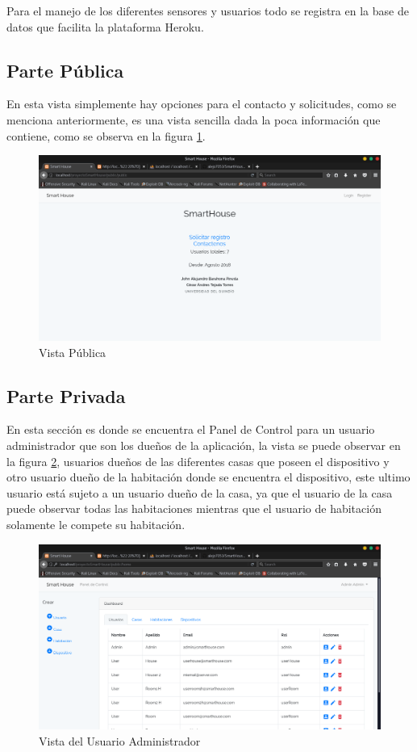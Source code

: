 Para el manejo de los diferentes sensores y usuarios todo se registra en la base de datos que facilita la plataforma Heroku.\\

\subsection{Parte Pública}

En esta vista simplemente hay opciones para el contacto y solicitudes, como se menciona anteriormente, es una vista sencilla dada la poca información que contiene, como se observa en la figura \ref{fig:publicview}.

\begin{figure}
	\centering
	\caption{Vista Pública}
	\label{fig:publicview}
	\includegraphics[width=0.9\linewidth]{Imagenes/Public_view}
\end{figure}



\subsection{Parte Privada}

En esta sección es donde se encuentra el Panel de Control para un usuario administrador que son los dueños de la aplicación, la vista se puede observar en la figura \ref{fig:adminview}, usuarios dueños de las diferentes casas que poseen el dispositivo y otro usuario dueño de la habitación donde se encuentra el dispositivo, este ultimo usuario está sujeto a un usuario dueño de la casa, ya que el usuario de la casa puede observar todas las habitaciones mientras que el usuario de habitación solamente le compete su habitación.\\

\begin{figure}
	\centering
	\caption{Vista del Usuario Administrador}
	\label{fig:adminview}
	\includegraphics[width=0.9\linewidth]{Imagenes/Admin_view}
\end{figure}

